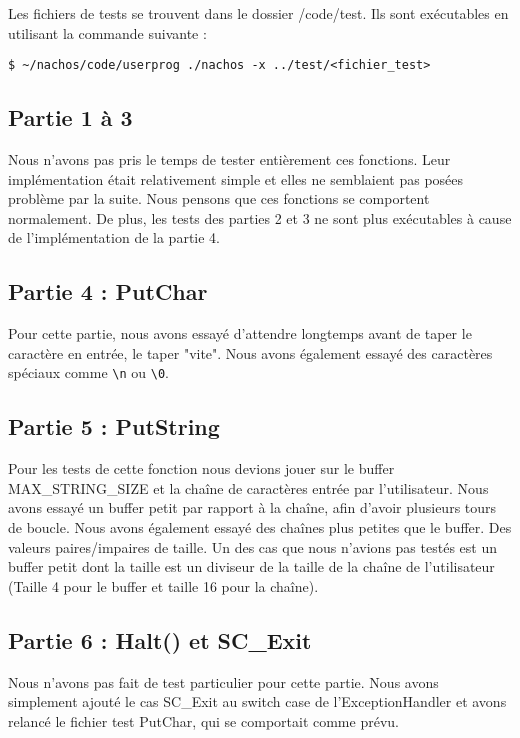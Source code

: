 \documentclass[a4paper]{article}
\newcommand*{\escape}[1]{\texttt{\textbackslash#1}}
\begin{document}
Les fichiers de tests se trouvent dans le dossier /code/test. Ils sont exécutables
en utilisant la commande suivante :

\begin{verbatim}
$ ~/nachos/code/userprog ./nachos -x ../test/<fichier_test>
\end{verbatim}

\subsection{Partie 1 à 3}

Nous n'avons pas pris le temps de tester entièrement ces fonctions. Leur implémentation
était relativement simple et elles ne semblaient pas posées problème par la suite.
Nous pensons que ces fonctions se comportent normalement. De plus, les tests des
parties 2 et 3 ne sont plus exécutables à cause de l'implémentation de la partie 4.

\subsection{Partie 4 : PutChar}

Pour cette partie, nous avons essayé d'attendre longtemps avant de taper le
caractère en entrée, le taper "vite". Nous avons également essayé des caractères
spéciaux comme \escape{n} ou \escape{0}.

\subsection{Partie 5 : PutString}

Pour les tests de cette fonction nous devions jouer sur le buffer
MAX\_STRING\_SIZE et la chaîne de caractères entrée par l'utilisateur. Nous avons
essayé un buffer petit par rapport à la chaîne, afin d'avoir plusieurs tours de boucle.
Nous avons également essayé des chaînes plus petites que le buffer. Des valeurs
paires/impaires de taille. Un des cas que nous n'avions pas testés est un buffer petit
dont la taille est un diviseur de la taille de la chaîne de l'utilisateur (Taille
4 pour le buffer et taille 16 pour la chaîne).

\subsection{Partie 6 : Halt() et SC\_Exit}

Nous n'avons pas fait de test particulier pour cette partie. Nous avons simplement
ajouté le cas SC\_Exit au switch case de l'ExceptionHandler et avons relancé le
fichier test PutChar, qui se comportait comme prévu.
\end{document}
